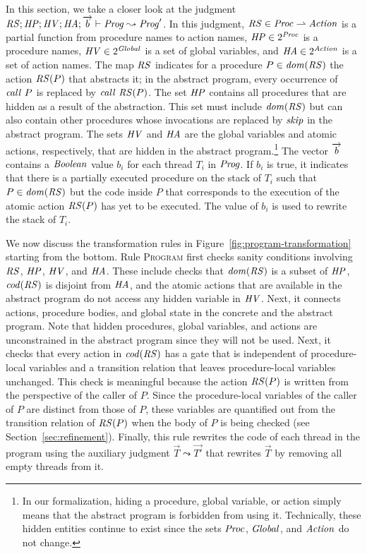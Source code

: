 In this section, we take a closer look at the judgment
$\mathit{RS};\mathit{HP};\mathit{HV};\mathit{HA};\overrightarrow{b} \vdash \mathit{Prog} \leadsto \mathit{Prog}'$.
In this judgment, 
$\mathit{RS} \in \mathit{Proc} \rightharpoonup \mathit{Action}$ is a partial function from procedure names to action names,
$\mathit{HP} \in 2^{\mathit{Proc}}$ is a procedure names,
$\mathit{HV} \in 2^{\mathit{Global}}$ is a set of global variables,
and $\mathit{HA} \in 2^{\mathit{Action}}$ is a set of action names.
The map $\mathit{RS}$ indicates for a procedure $P \in \mathit{dom}(\mathit{RS})$ the action $\mathit{RS}(P)$ 
that abstracts it;
in the abstract program, every occurrence of $\mathit{call}\ P$ is replaced by $\mathit{call}\ \mathit{RS}(P)$.
The set $\mathit{HP}$ contains all procedures that are hidden as a result of the abstraction.
This set must include $\mathit{dom}(\mathit{RS})$ but can also contain other procedures whose invocations 
are replaced by $\mathit{skip}$ in the abstract program.
The sets $\mathit{HV}$ and $\mathit{HA}$ are the global variables and atomic actions, 
respectively, that are hidden in the abstract program.\footnote{In our formalization, 
hiding a procedure, global variable, or action simply means that the abstract program is forbidden from using it.
Technically, these hidden entities continue to exist since the sets $\mathit{Proc}$, $\mathit{Global}$, and $\mathit{Action}$ do not change.}
The vector $\overrightarrow{b}$ contains a $\mathit{Boolean}$ value $b_i$ for each thread $T_i$ in $\mathit{Prog}$.
If $b_i$ is true, it indicates that there is a partially executed procedure on the stack of $T_i$ 
such that $P \in \mathit{dom}(\mathit{RS})$ but the code inside $P$ that corresponds to the execution of the atomic action $\mathit{RS}(P)$
has yet to be executed.
The value of $b_i$ is used to rewrite the stack of $T_i$.

We now discuss the transformation rules in Figure~\ref{fig:program-transformation} starting from the bottom.
Rule \textsc{Program} first checks sanity conditions involving $\mathit{RS}$, $\mathit{HP}$, $\mathit{HV}$, 
and $\mathit{HA}$.  These include checks that $\mathit{dom}(\mathit{RS})$ is a subset of $\mathit{HP}$,
$\mathit{cod}(\mathit{RS})$ is disjoint from $\mathit{HA}$, and the atomic actions that are 
available in the abstract program do not access any hidden variable in $\mathit{HV}$.
Next, it connects actions, procedure bodies, and global state in the concrete and the abstract program.
Note that hidden procedures, global variables, and actions are unconstrained in the abstract program since they will not be used.
Next, it checks that every action in $\mathit{cod}(\mathit{RS})$ has a gate 
that is independent of procedure-local variables and a transition relation that leaves 
procedure-local variables unchanged.  
This check is meaningful because the action $\mathit{RS}(P)$ is written from the 
perspective of the caller of $P$.
Since the procedure-local variables of the caller of $P$ are distinct from those of $P$,
these variables are quantified out from the transition relation of $\mathit{RS}(P)$ when 
the body of $P$ is being checked (see Section~\ref{sec:refinement}).
Finally, this rule rewrites the code of each thread in the program using the auxiliary judgment 
$\overrightarrow{T} \leadsto \overrightarrow{T'}$ that rewrites $\overrightarrow{T}$ by removing all empty threads from it.

